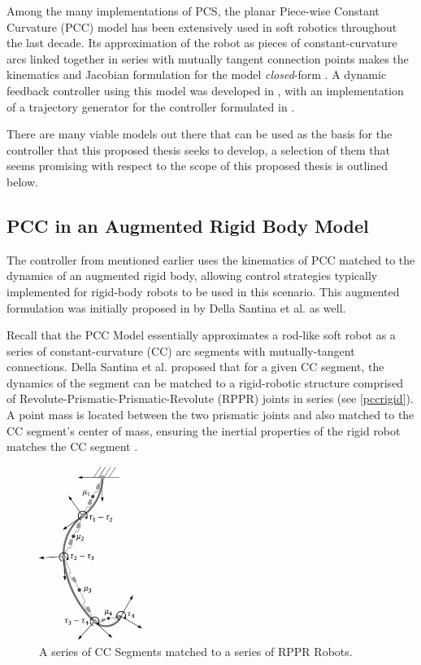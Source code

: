 Among the many implementations of PCS, the planar Piece-wise Constant Curvature (PCC) model has been extensively used in soft robotics throughout the last decade. Its approximation of the robot as pieces of constant-curvature arcs linked together in series with mutually tangent connection points makes the kinematics and Jacobian formulation for the model \textit{closed}-form \cite{websteriii_design_2010}. A dynamic feedback controller using this model was developed in \cite{della_santina_model-based_2020}, with an implementation of a trajectory generator for the controller formulated in \cite{dickson_real-time_2025}. 

There are many viable models out there that can be used as the basis for the controller that this proposed thesis seeks to develop, a selection of them that seems promising with respect to the scope of this proposed thesis is outlined below.
\subsection{PCC in an Augmented Rigid Body Model} \label{augmentedpccdef}
The controller from \cite{della_santina_model-based_2020} mentioned earlier uses the kinematics of PCC matched to the dynamics of an augmented rigid body, allowing control strategies typically implemented for rigid-body robots to be used in this scenario. This augmented formulation was initially proposed in \cite{della_santina_dynamic_2018} by Della Santina et al. as well. 

Recall that the PCC Model essentially approximates a rod-like soft robot as a series of constant-curvature (CC) arc segments with mutually-tangent connections. Della Santina et al. proposed that for a given CC segment, the dynamics of the segment can be matched to a rigid-robotic structure comprised of Revolute-Prismatic-Prismatic-Revolute (RPPR) joints in series (see \autoref{pccrigid}). A point mass is located between the two prismatic joints and also matched to the CC segment's center of mass, ensuring the inertial properties of the rigid robot matches the CC segment \cite{della_santina_dynamic_2018}.

\begin{figure}[!h]
    \centering
    \includegraphics[width=0.3\textwidth]{graphics/pccrigid.png}
    \caption{A series of CC Segments matched to a series of RPPR Robots. }
    \label{pccrigid}
\end{figure}

